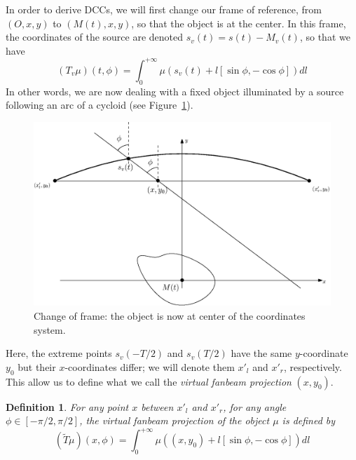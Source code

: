 \documentclass[a4paper]{article}
\numberwithin{equation}{section}
\newtheorem{definition}{Definition}
\begin{document}
In order to derive DCCs, we will first change our frame of reference, from $\left(O, x, y\right)$ to $\left(M(t), x, y\right)$, so that the object is at the center. In this frame, the coordinates of the source are denoted $s_v(t)=s(t)-M_v(t)$, so that we have
\begin{equation}
	(T_v\mu)(t,\phi) = \int_0^{+\infty} \mu \left( s_v(t) + l \left[ \sin \phi, -\cos \phi \right] \right) dl
\end{equation}
In other words, we are now dealing with a fixed object illuminated by a source following an arc of a cycloid (see Figure~\ref{fig:change_frame}).
\begin{figure}[!ht]
	\centering
	\includegraphics[width=12cm]{figs/frame_object.eps}
	\caption{Change of frame: the object is now at center of the coordinates system.\label{fig:change_frame}}
\end{figure}

Here, the extreme points $s_v(-T/2)$ and $s_v(T/2)$ have the same $y$-coordinate $y_0$ but their $x$-coordinates differ; we will denote them $x'_l$ and $x'_r$, respectively. This allow us to define what we call the \emph{virtual fanbeam projection} $(x,y_0)$.
\begin{definition}
	For any point $x$ between $x'_l$ and $x'_r$, for any angle $\phi \in \left[ -\pi/2, \pi/2\right]$, the \emph{virtual fanbeam projection} of the object $\mu$ is defined by
\begin{equation}
	\left( \tilde{T}\mu	\right)(x,\phi) = \int_0^{+\infty} \mu \left( (x,y_0) + l \left[ \sin \phi, -\cos \phi \right] \right) dl
\end{equation}
\end{definition}
\end{document}
